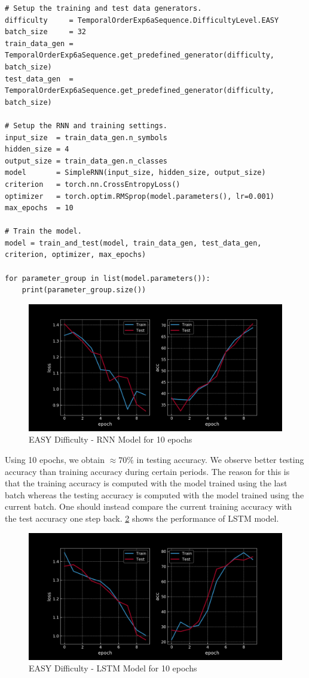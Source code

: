 \begin{verbatim}
# Setup the training and test data generators.
difficulty     = TemporalOrderExp6aSequence.DifficultyLevel.EASY
batch_size     = 32
train_data_gen = TemporalOrderExp6aSequence.get_predefined_generator(difficulty, batch_size)
test_data_gen  = TemporalOrderExp6aSequence.get_predefined_generator(difficulty, batch_size)

# Setup the RNN and training settings.
input_size  = train_data_gen.n_symbols
hidden_size = 4
output_size = train_data_gen.n_classes
model       = SimpleRNN(input_size, hidden_size, output_size)
criterion   = torch.nn.CrossEntropyLoss()
optimizer   = torch.optim.RMSprop(model.parameters(), lr=0.001)
max_epochs  = 10

# Train the model.
model = train_and_test(model, train_data_gen, test_data_gen, criterion, optimizer, max_epochs)

for parameter_group in list(model.parameters()):
    print(parameter_group.size())
\end{verbatim}
\begin{figure}[H]
    \centering
    \includegraphics[width=0.5\linewidth]{labs/08/images/rnn_easy_10.png}
    \caption{EASY Difficulty - RNN Model for 10 epochs}
    \label{fig:rnn_easy_10}
\end{figure}

Using 10 epochs, we obtain $\approx 70\%$ in testing accuracy. 
We observe better testing accuracy than training accuracy during certain periods. 
The reason for this is that the training accuracy is computed with the model trained using the last batch whereas the testing accuracy is computed with the model trained using the current batch. 
One should instead compare the current training accuracy with the test accuracy one step back.
\cref{fig:lstm_easy_10} shows the performance of LSTM model.

\begin{figure}[H]
    \centering
    \includegraphics[width=0.5\linewidth]{labs/08/images/lstm_easy_10.png}
    \caption{EASY Difficulty - LSTM Model for 10 epochs}
    \label{fig:lstm_easy_10}
\end{figure}

